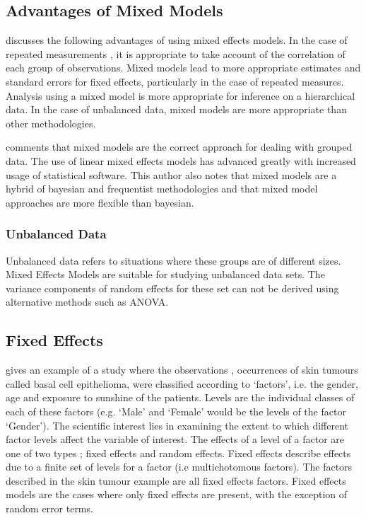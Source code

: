 \documentclass[12pt, a4paper]{report}
\theoremstyle{plain}
\theoremstyle{definition}
\theoremstyle{remark}
\begin{document}



\subsection{Advantages of Mixed Models}
\citet{BrownPrescott} discusses the  following advantages of using
mixed effects models. In the case of repeated measurements , it is
appropriate to take account of the correlation of each group of
observations. Mixed models lead to more appropriate estimates and
standard errors for fixed effects, particularly in the case of
repeated measures. Analysis using a mixed model is more
appropriate for inference on a hierarchical data. In the case of
unbalanced data, mixed models are more appropriate than other
methodologies.

\citet{Demi} comments that mixed models are the correct approach
for dealing with grouped data. The use of linear mixed effects
models has advanced greatly with increased usage of statistical
software. This author also notes that mixed models are a hybrid of
bayesian and frequentist methodologies and that mixed model
approaches are more flexible than bayesian.


\subsubsection{Unbalanced Data} Unbalanced data refers to situations where these groups are
of different sizes. Mixed Effects Models are suitable for studying
unbalanced data sets. The variance components of random effects
for these set can not be derived using alternative methods such as
ANOVA.

\subsection{Fixed Effects}
\citet{McCullSearle} gives an example of a study where the
observations , occurrences of skin tumours called basal cell
epithelioma, were classified according to `factors', i.e. the
gender, age and exposure to sunshine of the patients. Levels are
the individual classes of each of these factors (e.g. `Male' and
`Female' would be the levels of the factor `Gender'). The
scientific interest lies in examining the extent to which
different factor levels affect the variable of interest. The
effects of a level of a factor are one of two types ; fixed
effects and random effects. Fixed effects describe effects due to
a finite set of levels for a factor (i.e multichotomous factors).
The factors described in the skin tumour example are all fixed
effects factors. Fixed effects models are the cases where only
fixed effects are present, with the exception of random error
terms.
\end{document}
